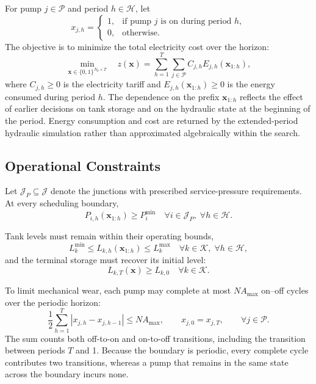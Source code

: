 \documentclass[Journal,letterpaper,InsideFigs]{ascelike-new}
\begin{document}
For pump $j\in\mathcal{P}$ and period $h\in\mathcal{H}$, let
\[
	x_{j,h}=
	\begin{cases}
		1, & \text{if pump $j$ is on during period $h$}, \\
		0, & \text{otherwise}.
	\end{cases}
\]
The objective is to minimize the total electricity cost over the horizon:
\begin{equation}
	\min_{\mathbf{x}\in\{0,1\}^{N_p\times T}}
	\quad z(\mathbf{x}) = \sum_{h=1}^{T} \sum_{j \in \mathcal{P}}
	C_{j,h} E_{j,h}(\mathbf{x}_{1:h}),
	\label{eq:objective}
\end{equation}
where $C_{j,h}\geq 0$ is the electricity tariff and $E_{j,h}(\mathbf{x}_{1:h})\geq 0$ is the energy consumed during period $h$. The dependence on the prefix $\mathbf{x}_{1:h}$ reflects the effect of earlier decisions on tank storage and on the hydraulic state at the beginning of the period. Energy consumption and cost are returned by the extended-period hydraulic simulation rather than approximated algebraically within the search.

\subsection{Operational Constraints}

Let $\mathcal{J}_P\subseteq\mathcal{J}$ denote the junctions with prescribed service-pressure requirements. At every scheduling boundary,
\begin{equation}
	P_{i,h}(\mathbf{x}_{1:h}) \geq P_{i}^{\min}
	\quad \forall i \in \mathcal{J}_P, \; \forall h \in \mathcal{H}.
	\label{eq:pressure_limits}
\end{equation}

Tank levels must remain within their operating bounds,
\begin{equation}
	L_{k}^{\min} \le L_{k,h}(\mathbf{x}_{1:h}) \le L_{k}^{\max}
	\quad \forall k \in \mathcal{K}, \; \forall h \in \mathcal{H},
	\label{eq:tank_bounds}
\end{equation}
and the terminal storage must recover its initial level:
\begin{equation}
	L_{k,T}(\mathbf{x}) \geq L_{k,0}
	\quad \forall k \in \mathcal{K}.
	\label{eq:tank_recovery}
\end{equation}

To limit mechanical wear, each pump may complete at most $NA_{\max}$ on--off cycles over the periodic horizon:
\begin{equation}
	\frac{1}{2}\sum_{h=1}^{T} |x_{j,h} - x_{j,h-1}| \le NA_{\max},
	\qquad x_{j,0}=x_{j,T},
	\qquad \forall j \in \mathcal{P}.
	\label{eq:actuation_limits}
\end{equation}
The sum counts both off-to-on and on-to-off transitions, including the transition between periods $T$ and 1. Because the boundary is periodic, every complete cycle contributes two transitions, whereas a pump that remains in the same state across the boundary incurs none.
\end{document}
